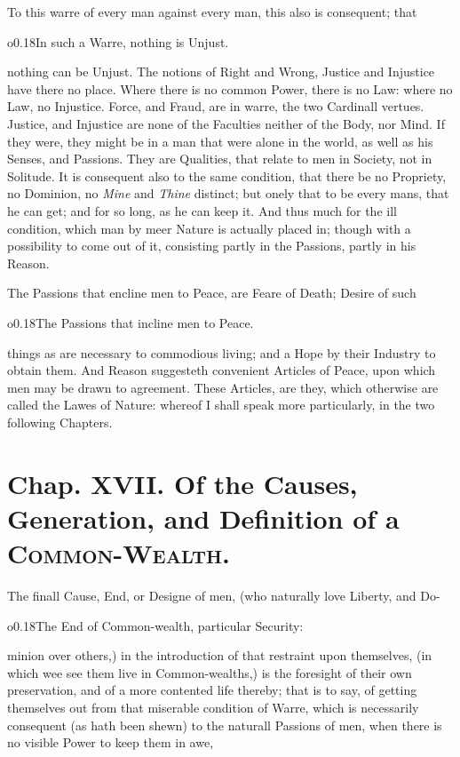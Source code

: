 To this warre of every man against every man, this also is consequent;
that \begin{wrapfigure}[4]{o}{0.18\textwidth}\wrapadj In such a Warre,
nothing is Unjust. \end{wrapfigure} nothing can be Unjust. The notions
of Right and Wrong, Justice and Injustice have there no place. Where
there is no common Power, there is no Law: where no Law, no Injustice.
Force, and Fraud, are in warre, the two Cardinall vertues. Justice,
and Injustice are none of the Faculties neither of the Body, nor Mind.
If they were, they might be in a man that were alone in the world, as
well as his Senses, and Passions. They are Qualities, that relate to
men in Society, not in Solitude. It is consequent also to the same
condition, that there be no Propriety, no Dominion, no \textit{Mine}
and \textit{Thine} distinct; but onely that to be every mans, that he
can get; and for so long, as he can keep it. And thus much for the ill
condition, which man by meer Nature is actually  placed in;
though with a possibility to come out of it, consisting partly in the
Passions, partly in his Reason.

The Passions that encline men to Peace, are Feare of Death; Desire of
such \begin{wrapfigure}[4]{o}{0.18\textwidth}\wrapadj The Passions that
incline men to Peace. \end{wrapfigure} things as are necessary to
commodious living; and a Hope by their Industry to obtain them. And
Reason suggesteth convenient Articles of Peace, upon which men may be
drawn to agreement. These Articles, are they, which otherwise are
called the Lawes of Nature: whereof I shall speak more particularly,
in the two following Chapters.


\section{Chap. XVII. Of the Causes, Generation, and
Definition of a \textsc{Common-Wealth}.}

The finall Cause, End, or Designe of men, (who naturally love Liberty,
and Do- \begin{wrapfigure}[4]{o}{0.18\textwidth}\wrapadj The End of
Common-wealth, particular Security: \end{wrapfigure} minion over
others,) in the introduction of that restraint upon themselves, (in
which wee see them live in Common-wealths,) is the foresight of their
own preservation, and of a more contented life thereby; that is to
say, of getting themselves out from that miserable condition of Warre,
which is necessarily consequent (as hath been shewn) to the naturall
Passions of men, when there is no visible Power to keep them in awe,


